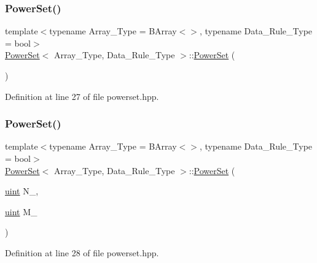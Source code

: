 \subsubsection{\texorpdfstring{Power\+Set()}{PowerSet()}\hspace{0.1cm}{\footnotesize\ttfamily [1/2]}}
{\footnotesize\ttfamily template$<$typename Array\+\_\+\+Type  = B\+Array$<$$>$, typename Data\+\_\+\+Rule\+\_\+\+Type  = bool$>$ \\
\hyperlink{class_power_set}{Power\+Set}$<$ Array\+\_\+\+Type, Data\+\_\+\+Rule\+\_\+\+Type $>$\+::\hyperlink{class_power_set}{Power\+Set} (\begin{DoxyParamCaption}{ }\end{DoxyParamCaption})\hspace{0.3cm}{\ttfamily [inline]}}



Definition at line 27 of file powerset.\+hpp.

\mbox{\label{class_power_set_abf6ac4224da7ae4d187d0d63833615b1}} 
\subsubsection{\texorpdfstring{Power\+Set()}{PowerSet()}\hspace{0.1cm}{\footnotesize\ttfamily [2/2]}}
{\footnotesize\ttfamily template$<$typename Array\+\_\+\+Type  = B\+Array$<$$>$, typename Data\+\_\+\+Rule\+\_\+\+Type  = bool$>$ \\
\hyperlink{class_power_set}{Power\+Set}$<$ Array\+\_\+\+Type, Data\+\_\+\+Rule\+\_\+\+Type $>$\+::\hyperlink{class_power_set}{Power\+Set} (\begin{DoxyParamCaption}\item[{\hyperlink{typedefs_8hpp_a91ad9478d81a7aaf2593e8d9c3d06a14}{uint}}]{N\+\_\+,  }\item[{\hyperlink{typedefs_8hpp_a91ad9478d81a7aaf2593e8d9c3d06a14}{uint}}]{M\+\_\+ }\end{DoxyParamCaption})\hspace{0.3cm}{\ttfamily [inline]}}



Definition at line 28 of file powerset.\+hpp.

\mbox{\label{class_power_set_a89a176c9517e81a066adffad3c46aba5}} 
